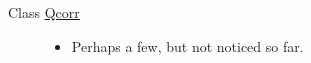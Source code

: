 \label{bug__bug000001}
\hypertarget{bug__bug000001}{}
 \begin{description}
\item[Class \hyperlink{classQcorr}{Qcorr} ]\begin{itemize}
\item Perhaps a few, but not noticed so far.\end{itemize}


\end{description}

